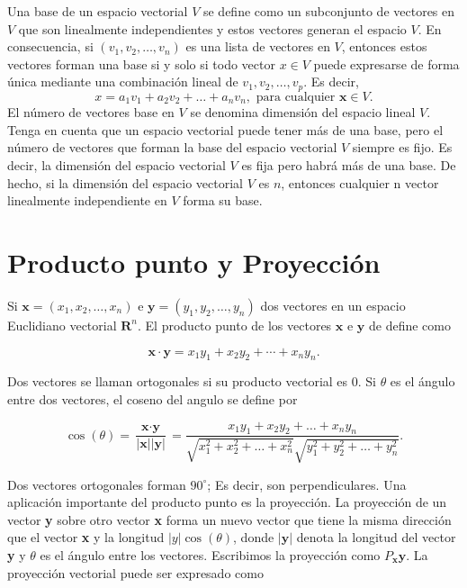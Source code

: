 Una base de un espacio vectorial $V$ se define como un subconjunto de vectores en $V$ que son linealmente independientes y estos vectores generan el espacio $V$. En consecuencia, si $(v_1 , v_2 , \ldots , v_n)$ es una lista de vectores en $V$, entonces estos vectores forman una base si y solo si todo vector $x \in V$ puede expresarse de forma única mediante una combinación lineal de $v_1 , v_2 , \ldots , v_p$. Es decir, 
$$x = a_1 v_1 + a_2 v_2 + \ldots + a_n v_n,\mbox{ para cualquier } \textbf{x}\in V.$$ 
El número de vectores base en $V$ se denomina dimensión del espacio lineal $V$. Tenga en cuenta que un espacio vectorial puede tener más de una base, pero el número de vectores que forman la base del espacio vectorial $V$ siempre es fijo. Es decir, la dimensión del espacio vectorial $V$ es fija pero habrá más de una base. De hecho, si la dimensión del espacio vectorial $V$ es $n$, entonces cualquier n vector linealmente independiente en $V$ forma su base.


\section{Producto punto y Proyección}

Si $\textbf{x}=(x_1,x_2,\ldots,x_n)$ e $\textbf{y}=(y_1,y_2,\ldots, y_n)$ dos vectores en un espacio Euclidiano vectorial $\textbf{R}^n$. El producto punto de los vectores $\textbf{x}$ e $\textbf{y}$ de define como

$$\textbf{x}\cdot \textbf{y} = x_1y_1+x_2y_2+\cdots + x_ny_n.$$

Dos vectores se llaman ortogonales si su  producto vectorial es $0$. Si $\theta$ es el ángulo entre dos vectores, el coseno del angulo se define por

\begin{tcolorbox}
    \begin{equation}
	\cos(\theta)=\dfrac{\textbf{x}\cdot \textbf{y}}{|\textbf{x}||\textbf{y}|}=\dfrac{x_1y_1+x_2y_2+\ldots  +x_ny_n}{\sqrt{x_1^2+x_2^2+\ldots + x_n^2}\sqrt{y_1^2+y_2^2+\ldots + y_n^2}}.
    \end{equation}
\end{tcolorbox}

Dos vectores ortogonales forman $90^\circ$; Es decir, son perpendiculares. Una aplicación importante del producto punto es la proyección. La proyección de un vector \textbf{y} sobre otro vector \textbf{x} forma un nuevo vector que tiene la misma dirección que el vector \textbf{x} y la longitud $|y|\cos(\theta)$, donde $|\textbf{y}|$ denota la longitud del vector \textbf{y} y $\theta$ es el ángulo entre los vectores. Escribimos la proyección como $P_{\textbf{x}}\textbf{y}$. La proyección vectorial puede ser expresado como

